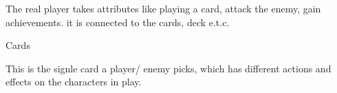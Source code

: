 \begin{DoxyEnumerate}
\begin{DoxyItemize}
\item The real player takes attributes like playing a card, attack the enemy, gain achievements. it is connected to the cards, deck e.\+t.\+c.
\end{DoxyItemize}
\item Cards
\begin{DoxyItemize}
\item This is the signle card a player/ enemy picks, which has different actions and effects on the characters in play. ~\newline
 
\end{DoxyItemize}
\end{DoxyEnumerate}